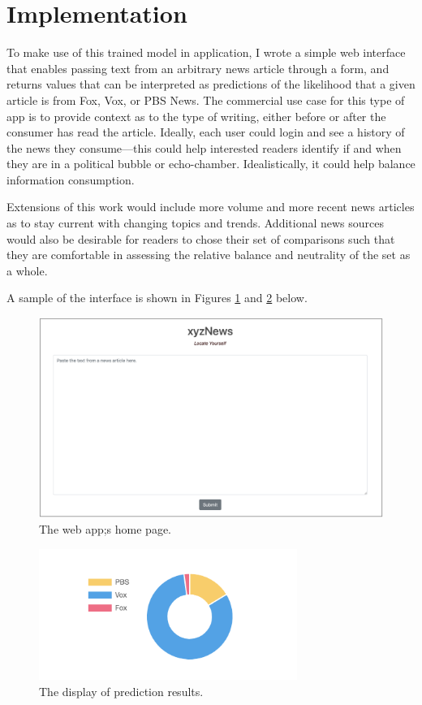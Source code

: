 \documentclass{article}
\begin{document}
	\section{Implementation}
	
	To make use of this trained model in application, I wrote a simple web interface that enables passing text from an arbitrary news article through a form, and returns values that can be interpreted as predictions of the likelihood that a given article is from Fox, Vox, or PBS News. The commercial use case for this type of app is to provide context as to the type of writing, either before or after the consumer has read the article. Ideally, each user could login and see a history of the news they consume---this could help interested readers identify if and when they are in a political bubble or echo-chamber. Idealistically, it could help balance information consumption. 
	
	Extensions of this work would include more volume and more recent news articles as to stay current with changing topics and trends. Additional news sources would also be desirable for readers to chose their set of comparisons such that they are comfortable in assessing the relative balance and neutrality of the set as a whole. 
	
	A sample of the interface is shown in Figures \ref{fig:form} and \ref{fig:results} below. 	
	
	\begin{figure}[H]
		\includegraphics[width=\textwidth]{figures/images/web-form.png}
		\caption{The web app;s home page.}
		\label{fig:form}
	\end{figure}

	\begin{figure}[H]
		\centering
		\includegraphics[width=0.75\textwidth]{figures/images/web-results.png}
		\caption{The display of prediction results.}
		\label{fig:results}
	\end{figure}
		
\end{document}
